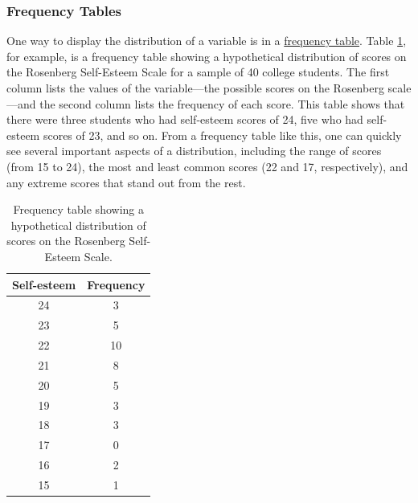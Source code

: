 \documentclass[
]{krantz}
\begin{document}
\subsubsection*{Frequency Tables}\label{frequency-tables}


One way to display the distribution of a variable is in a \hyperref[frequency-table]{frequency table}. Table \ref{tab:frequency}, for example, is a frequency table showing a hypothetical distribution of scores on the Rosenberg Self-Esteem Scale for a sample of 40 college students. The first column lists the values of the variable---the possible scores on the Rosenberg scale---and the second column lists the frequency of each score. This table shows that there were three students who had self-esteem scores of 24, five who had self-esteem scores of 23, and so on. From a frequency table like this, one can quickly see several important aspects of a distribution, including the range of scores (from 15 to 24), the most and least common scores (22 and 17, respectively), and any extreme scores that stand out from the rest.

\begin{table}

\caption{\label{tab:frequency}Frequency table showing a hypothetical distribution of scores on the Rosenberg Self-Esteem Scale.}
\centering
\begin{tabular}[t]{c|c}
\hline
Self-esteem & Frequency\\
\hline
24 & 3\\
\hline
23 & 5\\
\hline
22 & 10\\
\hline
21 & 8\\
\hline
20 & 5\\
\hline
19 & 3\\
\hline
18 & 3\\
\hline
17 & 0\\
\hline
16 & 2\\
\hline
15 & 1\\
\hline
\end{tabular}
\end{table}
\end{document}

